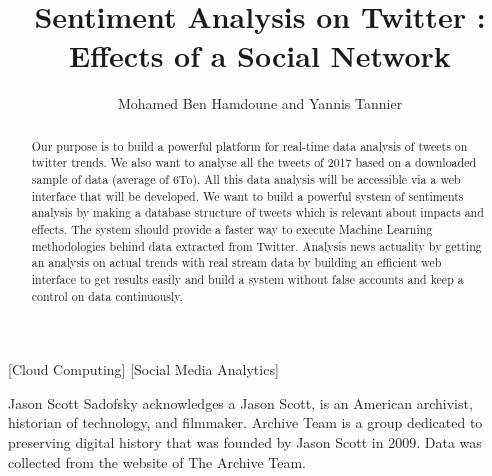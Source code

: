 \documentclass{acmtog} %
\begin{document}

\title{Sentiment Analysis on Twitter : Effects of a Social Network} %

\author{Mohamed Ben Hamdoune {\upshape and} Yannis Tannier
}

[Cloud Computing]
[Social Media Analytics]




\maketitle

\begin{bottomstuff}
Jason Scott Sadofsky acknowledges a Jason Scott, is an American archivist, historian of technology, and filmmaker. Archive Team is a group dedicated to preserving digital history that was founded by Jason Scott in 2009. Data was collected from the website of The Archive Team.

\end{bottomstuff}


\begin{abstract}

Our purpose is to build a powerful platform for real-time data analysis of tweets on twitter trends. We also want to analyse all the tweets of 2017 based on a downloaded sample of data (average of 6To). All this data analysis will be accessible via a web interface that will be developed. We want to build a powerful system of sentiments analysis by making a database structure of tweets which is relevant about impacts and effects. The system should provide a faster way to execute Machine Learning methodologies behind data extracted from Twitter. Analysis news actuality by getting an analysis on actual trends with real stream data by building an efficient web interface to get results easily and build a system without false accounts and keep a control on data continuously.
\end{abstract}
\end{document}
